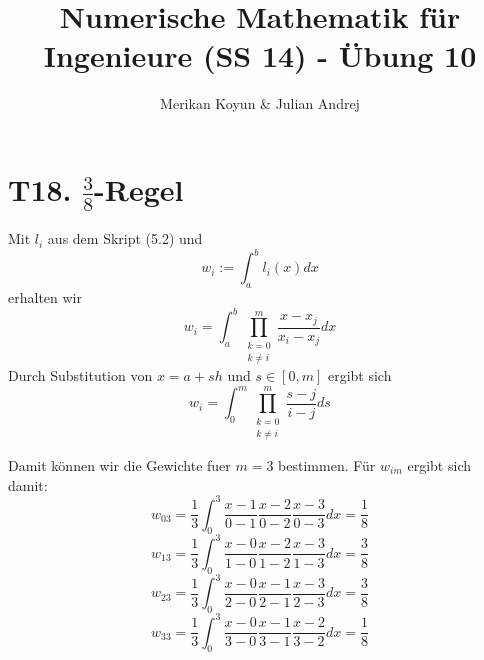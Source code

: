 \documentclass[11pt]{article}
\theoremstyle{plain}
\theoremstyle{definition}
\renewcommand{\o}{\"{o}}
\renewcommand{\u}{\"{u}}
\begin{document}
\title{Numerische Mathematik f\u r Ingenieure (SS 14) - \"{U}bung 10}
\author{Merikan Koyun \& Julian Andrej}
\maketitle

\section*{T18. $\frac{3}{8}$-Regel}
Mit $l_i$ aus dem Skript (5.2) und
\[ w_i := \int_a^b l_i(x) dx \]
erhalten wir
\[ w_i = \int_a^b \prod\limits_{\substack{k=0 \\ k\neq i}}^m \frac{x-x_j}{x_i-x_j} dx \]
Durch Substitution von $x = a + sh$ und $s \in [0,m]$ ergibt sich
\[ w_i = \int_0^m \prod\limits_{\substack{k=0 \\ k\neq i}}^m \frac{s-j}{i-j} ds \]

Damit k\o nnen wir die Gewichte fuer $m = 3$ bestimmen. F\u r $w_{im}$ ergibt sich damit:
\[ w_{03} = \frac{1}{3} \int_0^3 \frac{x-1}{0-1} \frac{x-2}{0-2} \frac{x-3}{0-3} dx = \frac{1}{8} \]
\[ w_{13} = \frac{1}{3} \int_0^3 \frac{x-0}{1-0} \frac{x-2}{1-2} \frac{x-3}{1-3} dx = \frac{3}{8} \]
\[ w_{23} = \frac{1}{3} \int_0^3 \frac{x-0}{2-0} \frac{x-1}{2-1} \frac{x-3}{2-3} dx = \frac{3}{8} \]
\[ w_{33} = \frac{1}{3} \int_0^3 \frac{x-0}{3-0} \frac{x-1}{3-1} \frac{x-2}{3-2} dx = \frac{1}{8} \]
\end{document}
